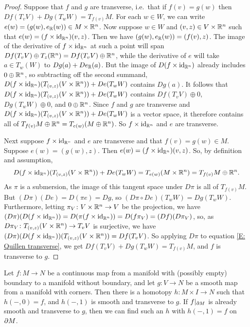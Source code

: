 \begin{remark}
\begin{proof}
	Suppose that $f$ and $g$ are transverse, i.e.\ that if $f(v)=g(w)$ then $Df(T_vV)+Dg(T_wW)=T_{f(v)}M$.
	For each $w\in W$, we can write $e(w)=(g(w),e_{\mathbb{R}}(w))\in M\times \mathbb{R}^n$.
	Now suppose $w\in W$ and $(v,z)\in V\times \mathbb{R}^n$ such that $e(w)=(f\times\mathrm{id}_{\mathbb{R}^n})(v,z)$.
	Then we have $(g(w),e_{\mathbb{R}}(w))=(f(v),z)$.
	The image of the derivative of $f\times\mathrm{id}_{\mathbb{R}^n}$ at such a point will span $Df(T_vV)\oplus T_z(\mathbb{R}^{n})= Df(T_vV)\oplus \mathbb{R}^{n}$, while the derivative of $e$ will take $a\in T_w(W)$ to $Dg(a)+ De_{\mathbb{R}}(a)$.
	But the image of $D(f\times\mathrm{id}_{\mathbb{R}^n})$ already includes $0\oplus \mathbb{R}^{n}$, so subtracting off the second summand, $D(f\times\mathrm{id}_{\mathbb{R}^{n}})(T_{(v,z)}(V\times \mathbb{R}^n))+De(T_wW)$ contains $Dg(a)$.
	It follows that $D(f\times\mathrm{id}_{\mathbb{R}^{n}})(T_{(v,z)}(V\times \mathbb{R}^n))+De(T_wW)$ contains $Df(T_vV)\oplus 0$, $Dg(T_wW)\oplus 0$, and $0\oplus \mathbb{R}^n$.
	Since $f$ and $g$ are transverse and $D(f\times\mathrm{id}_{\mathbb{R}^{n}})(T_{(v,z)}(V\times \mathbb{R}^n))+De(T_wW)$ is a vector space, it therefore contains all of $T_{f(v)}M\oplus \mathbb{R}^n=T_{e(w)}(M\oplus \mathbb{R}^n)$.
	So $f\times \mathrm{id}_{\mathbb{R}^n}$ and $e$ are transverse.

	Next suppose $f\times \mathrm{id}_{\mathbb{R}^n}$ and $e$ are transverse and that $f(v)=g(w)\in M$.
	Suppose $e(w)=(g(w),z)$.
	Then $e(w)=(f\times \mathrm{id}_{\mathbb{R}^n})(v,z)$.
	So, by definition and assumption,
	\begin{equation}\label{E: Quillen transverse}
		D(f\times\mathrm{id}_{\mathbb{R}^{n}})(T_{(v,z)}(V\times \mathbb{R}^n))+De(T_wW)= T_{e(w)}(M\times \mathbb{R}^n)=T_{f(v)}M\oplus \mathbb{R}^n.
	\end{equation}
	As $\pi$ is a submersion, the image of this tangent space under $D\pi$ is all of $T_{f(v)}M$.
	But $(D\pi)(De)=D(\pi e)=Dg$, so $(D\pi\circ De)(T_wW)=Dg(T_wW)$.
	Furthermore, letting $\pi_V \colon V\times \mathbb{R}^n\to V$ be the projection, we have $(D\pi)(D(f\times\mathrm{id}_{\mathbb{R}^{n}}))=D(\pi(f\times\mathrm{id}_{\mathbb{R}^{n}}))=D(f\pi_V)=(Df)(D\pi_V)$, so, as $D\pi_V \colon T_{(v,z)}(V\times \mathbb{R}^n)\to T_vV$ is surjective, we have $(D\pi)(D(f\times\mathrm{id}_{\mathbb{R}^{n}}))(T_{(v,z)}(V\times \mathbb{R}^n))=Df(T_vV)$.
	So applying $D\pi$ to equation \eqref{E: Quillen transverse}, we get $Df(T_vV)+Dg(T_wW)=T_{f(v)}M$, and $f$ is transverse to $g$.
\end{proof}

\begin{theorem}\label{T: basic trans}
	Let $f \colon M\to N$ be a continuous map from a manifold with (possibly empty) boundary to a manifold without boundary, and let $g \colon V\to N$ be a smooth map from a manifold with corners.
	Then there is a homotopy $h \colon M\times I\to N$ such that $h(-,0)=f$, and $h(-,1)$ is smooth and transverse to $g$.
	If $f|_{\partial M}$ is already smooth and transverse to $g$, then we can find such an $h$ with $h(-,1)=f$ on $\partial M$.
\end{theorem}


\end{remark}
